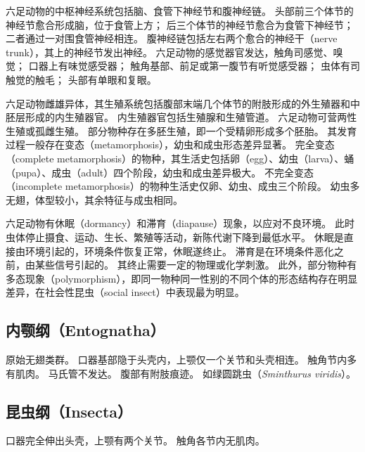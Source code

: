 \documentclass[11pt]{article}
\begin{document}
六足动物的中枢神经系统包括脑、食管下神经节和腹神经链。
头部前三个体节的神经节愈合形成脑，位于食管上方；
后三个体节的神经节愈合为食管下神经节；
二者通过一对围食管神经相连。
腹神经链包括左右两个愈合的神经干（nerve trunk），其上的神经节发出神经。
六足动物的感觉器官发达，触角司感觉、嗅觉；
口器上有味觉感受器；
触角基部、前足或第一腹节有听觉感受器；
虫体有司触觉的触毛；
头部有单眼和复眼。

\newline

六足动物雌雄异体，其生殖系统包括腹部末端几个体节的附肢形成的外生殖器和中胚层形成的内生殖器官。
内生殖器官包括生殖腺和生殖管道。
六足动物可营两性生殖或孤雌生殖。
部分物种存在多胚生殖，即一个受精卵形成多个胚胎。
其发育过程一般存在变态（metamorphosis），幼虫和成虫形态差异显著。
完全变态（complete metamorphosis）的物种，其生活史包括卵（egg）、幼虫（larva）、蛹（pupa）、成虫（adult）四个阶段，幼虫和成虫差异极大。
不完全变态（incomplete metamorphosis）的物种生活史仅卵、幼虫、成虫三个阶段。
幼虫多无翅，体型较小，其余特征与成虫相同。

\newline

六足动物有休眠（dormancy）和滞育（diapause）现象，以应对不良环境。
此时虫体停止摄食、运动、生长、繁殖等活动，新陈代谢下降到最低水平。
休眠是直接由环境引起的，环境条件恢复正常，休眠遂终止。
滞育是在环境条件恶化之前，由某些信号引起的。
其终止需要一定的物理或化学刺激。
此外，部分物种有多态现象（polymorphism），即同一物种同一性别的不同个体的形态结构存在明显差异，在社会性昆虫（social insect）中表现最为明显。



























\subsection{内颚纲（Entognatha）}
原始无翅类群。
口器基部隐于头壳内，上颚仅一个关节和头壳相连。
触角节内多有肌肉。
马氏管不发达。
腹部有附肢痕迹。
如绿圆跳虫（\textit{Sminthurus viridis}）。

\subsection{昆虫纲（Insecta）}
口器完全伸出头壳，上颚有两个关节。
触角各节内无肌肉。
\end{document}
